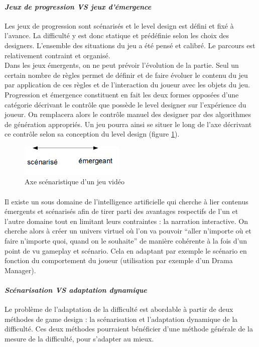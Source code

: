 	\paragraph{\emph{Jeux de progression VS jeux d’émergence} \\ \quad}
Les jeux de progression sont scénarisés et le level design est défini et fixé à l’avance. La difficulté y est donc statique et prédéfinie selon les choix des designers. L’ensemble des situations du jeu a été pensé et calibré. Le parcours est relativement contraint et organisé. \\
Dans les jeux émergents, on ne peut prévoir l’évolution de la partie. Seul un certain nombre de règles permet de définir et de faire évoluer le contenu du jeu par application de ces règles et de l’interaction du joueur avec les objets du jeu. \\
Progression et émergence constituent en fait les deux formes opposées d’une catégorie décrivant le contrôle que possède le level designer sur l’expérience du joueur. On remplacera alors le contrôle manuel des designer par des algorithmes de génération appropriés. Un jeu pourra ainsi se situer le long de l’axe décrivant ce contrôle selon sa conception du level design (figure \ref{axe_scenaristique}). 
\begin{figure}[hbtp]
\centering
\includegraphics[width=5cm]{images/axe_scenaristique.png}
\caption{Axe scénaristique d'un jeu vidéo}
\label{axe_scenaristique}
\end{figure}

\paragraph{}Il existe un sous domaine de l’intelligence artificielle qui cherche à lier contenus émergents et scénarisés afin de tirer parti des avantages respectifs de l’un et l’autre domaine tout en limitant leurs contraintes : la narration interactive. On cherche alors à créer un univers virtuel où l’on va pouvoir “aller n’importe où et faire n’importe quoi, quand on le souhaite” de manière cohérente à la fois d’un point de vu gameplay et scénario. Cela en adaptant par exemple le scénario en fonction du comportement du joueur (utilisation par exemple d’un Drama Manager).

			\paragraph{\emph{Scénarisation VS adaptation dynamique} \\ \quad}
Le problème de l’adaptation de la difficulté est abordable à partir de deux méthodes de game design : la scénarisation et l’adaptation dynamique de la difficulté.  Ces deux méthodes pourraient bénéficier d’une méthode générale de la mesure de la difficulté, pour s’adapter au mieux.

